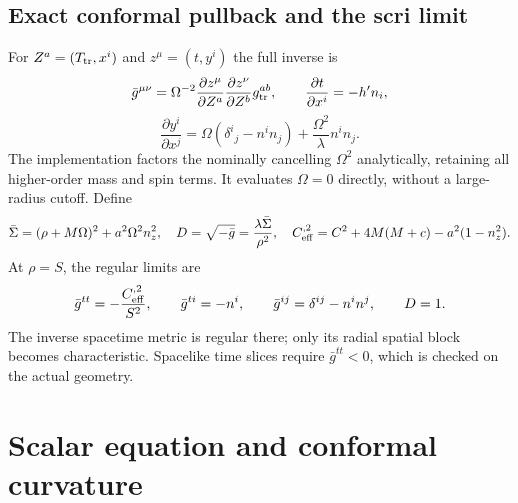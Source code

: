 \documentclass[11pt,letterpaper]{article}
\newcommand{\G}{\bar g}
\begin{document}

\subsection{Exact conformal pullback and the scri limit}
For $Z^a=(T_{\rm tr},x^i)$ and $z^\mu=(t,y^i)$ the full inverse is
\begin{equation}\label{eq:pullback}
 \G^{\mu\nu}=\Omega^{-2}
 \frac{\partial z^\mu}{\partial Z^a}\frac{\partial z^\nu}{\partial Z^b}g_{\rm tr}^{ab},
 \qquad \frac{\partial t}{\partial x^i}=-h'n_i,
\end{equation}
\begin{equation}
 \frac{\partial y^i}{\partial x^j}
 =\Omega(\delta^i{}_j-n^in_j)+\frac{\Omega^2}{\lambda}n^in_j.
\end{equation}
The implementation factors the nominally cancelling $\Omega^2$ analytically, retaining all higher-order mass and spin terms. It evaluates $\Omega=0$ directly, without a large-radius cutoff. Define
\begin{equation}
 \bar\Sigma=(\rho+M\Omega)^2+a^2\Omega^2n_z^2,\quad
 D=\sqrt{-\G}=\frac{\lambda\bar\Sigma}{\rho^2},\quad
 C_{\rm eff}^{,2}=C^2+4M(M+c)-a^2(1-n_z^2).
\end{equation}
At $\rho=S$, the regular limits are
\begin{equation}\label{eq:scrilimit}
 \G^{tt}=-\frac{C_{\rm eff}^{,2}}{S^2},\qquad
 \G^{ti}=-n^i,\qquad \G^{ij}=\delta^{ij}-n^in^j,\qquad D=1.
\end{equation}
The inverse spacetime metric is regular there; only its radial spatial block becomes characteristic. Spacelike time slices require $\G^{tt}<0$, which is checked on the actual geometry.

\clearpage
\section{Scalar equation and conformal curvature}
\end{document}
